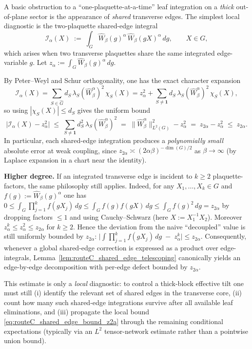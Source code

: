 \begin{remark}\label{rem:routeC_shared_edge_diagnostic}
A basic obstruction to a ``one-plaquette-at-a-time'' leaf integration on a \emph{thick} out-of-plane sector is the appearance of \emph{shared} transverse edges.
The simplest local diagnostic is the two-plaquette shared-edge integral
\begin{equation}\label{eq:routeC_shared_edge_integral}
\mathcal I_\alpha(X)\;:=\;\int_G \widehat W_\beta(g)^\alpha\,\widehat W_\beta(gX)^\alpha\,dg,
\qquad X\in G,
\end{equation}
which arises when two transverse plaquettes share the same integrated edge-variable $g$.
Let $z_\alpha:=\int_G \widehat W_\beta(g)^\alpha\,dg$.

By Peter--Weyl and Schur orthogonality, one has the exact character expansion
\[
\mathcal I_\alpha(X)
=
\sum_{S\in\widehat G} d_S\,\lambda_S(\widehat W_\beta^\alpha)^2\,\chi_S(X)
=
z_\alpha^2
+
\sum_{S\neq \mathbf 1} d_S\,\lambda_S(\widehat W_\beta^\alpha)^2\,\chi_S(X),
\]
so using $|\chi_S(X)|\le d_S$ gives the uniform bound
\begin{equation}\label{eq:routeC_shared_edge_bound_z2a}
\bigl|\mathcal I_\alpha(X)-z_\alpha^2\bigr|
\;\le\;
\sum_{S\neq \mathbf 1} d_S^2\,\lambda_S(\widehat W_\beta^\alpha)^2
\;=\;
\|\widehat W_\beta^\alpha\|_{L^2(G)}^2-z_\alpha^2
\;=\;
z_{2\alpha}-z_\alpha^2
\;\le\;
z_{2\alpha}.
\end{equation}
In particular, each shared-edge integration produces a \emph{polynomially small} absolute error at weak coupling,
since $z_{2\alpha}\asymp (2\alpha\beta)^{-\dim(G)/2}$ as $\beta\to\infty$ (by Laplace expansion in a chart near the identity).

\medskip
\noindent\textbf{Higher degree.}
If an integrated transverse edge is incident to $k\ge 2$ plaquette-factors, the same philosophy still applies.
Indeed, for any $X_1,\dots,X_k\in G$ and $f(g):=\widehat W_{\beta}(g)^{\alpha}$ one has
\(
0\le \int_G \prod_{j=1}^k f(gX_j)\,dg\le \int_G f(g)f(gX)\,dg\le \int_G f(g)^2\,dg=z_{2\alpha}
\)
by dropping factors $\le 1$ and using Cauchy--Schwarz (here $X:=X_1^{-1}X_2$).
Moreover $z_{\alpha}^k\le z_{\alpha}^2\le z_{2\alpha}$ for $k\ge 2$.
Hence the deviation from the naive ``decoupled'' value is still uniformly bounded by $z_{2\alpha}$:
\(
\bigl|\int \prod_{j=1}^k f(gX_j)\,dg\; -\; z_{\alpha}^k\bigr|\le z_{2\alpha}.
\)
Consequently, whenever a global shared-edge correction is expressed as a product over edge-integrals,
Lemma~\ref{lem:routeC_shared_edge_telescoping} canonically yields an edge-by-edge decomposition with per-edge defect bounded by $z_{2\alpha}$.

This estimate is only a \emph{local} diagnostic: to control a thick-block effective tilt one must still (i) identify the relevant set of shared edges in the transverse core,
(ii) count how many such shared-edge integrations survive after all available leaf eliminations, and (iii) propagate the local bound \eqref{eq:routeC_shared_edge_bound_z2a}
through the remaining conditional expectations (typically via an $L^2$ tensor-network estimate rather than a pointwise union bound).
\end{remark}


